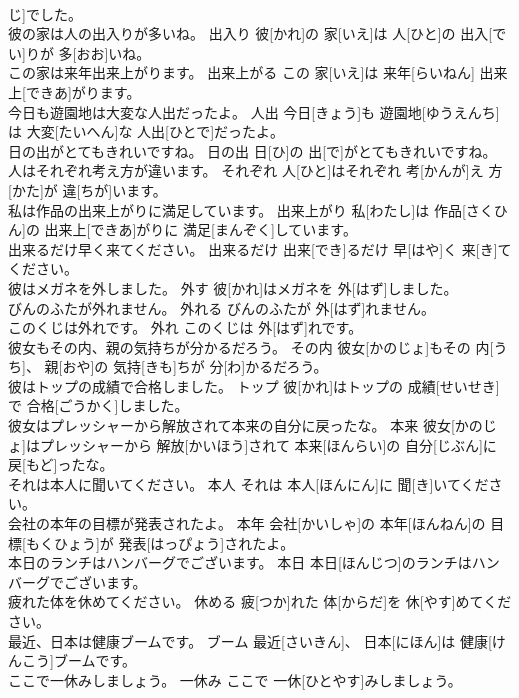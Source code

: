 \documentclass[8pt]{extreport}
\begin{document}
\begin{CJK}{UTF8}{min}
\\	じ]でした。	
\\	彼の家は人の出入りが多いね。	出入り	彼[かれ]の 家[いえ]は 人[ひと]の 出入[でい]りが 多[おお]いね。	
\\	この家は来年出来上がります。	出来上がる	この 家[いえ]は 来年[らいねん] 出来上[できあ]がります。	
\\	今日も遊園地は大変な人出だったよ。	人出	今日[きょう]も 遊園地[ゆうえんち]は 大変[たいへん]な 人出[ひとで]だったよ。	
\\	日の出がとてもきれいですね。	日の出	日[ひ]の 出[で]がとてもきれいですね。	
\\	人はそれぞれ考え方が違います。	それぞれ	人[ひと]はそれぞれ 考[かんが]え 方[かた]が 違[ちが]います。	
\\	私は作品の出来上がりに満足しています。	出来上がり	私[わたし]は 作品[さくひん]の 出来上[できあ]がりに 満足[まんぞく]しています。	
\\	出来るだけ早く来てください。	出来るだけ	出来[でき]るだけ 早[はや]く 来[き]てください。	
\\	彼はメガネを外しました。	外す	彼[かれ]はメガネを 外[はず]しました。	
\\	びんのふたが外れません。	外れる	びんのふたが 外[はず]れません。	
\\	このくじは外れです。	外れ	このくじは 外[はず]れです。	
\\	彼女もその内、親の気持ちが分かるだろう。	その内	彼女[かのじょ]もその 内[うち]、 親[おや]の 気持[きも]ちが 分[わ]かるだろう。	
\\	彼はトップの成績で合格しました。	トップ	彼[かれ]はトップの 成績[せいせき]で 合格[ごうかく]しました。	
\\	彼女はプレッシャーから解放されて本来の自分に戻ったな。	本来	彼女[かのじょ]はプレッシャーから 解放[かいほう]されて 本来[ほんらい]の 自分[じぶん]に 戻[もど]ったな。	
\\	それは本人に聞いてください。	本人	それは 本人[ほんにん]に 聞[き]いてください。	
\\	会社の本年の目標が発表されたよ。	本年	会社[かいしゃ]の 本年[ほんねん]の 目標[もくひょう]が 発表[はっぴょう]されたよ。	
\\	本日のランチはハンバーグでございます。	本日	本日[ほんじつ]のランチはハンバーグでございます。	
\\	疲れた体を休めてください。	休める	疲[つか]れた 体[からだ]を 休[やす]めてください。	
\\	最近、日本は健康ブームです。	ブーム	最近[さいきん]、 日本[にほん]は 健康[けんこう]ブームです。	
\\	ここで一休みしましょう。	一休み	ここで 一休[ひとやす]みしましょう。	

\end{CJK}
\end{document}
